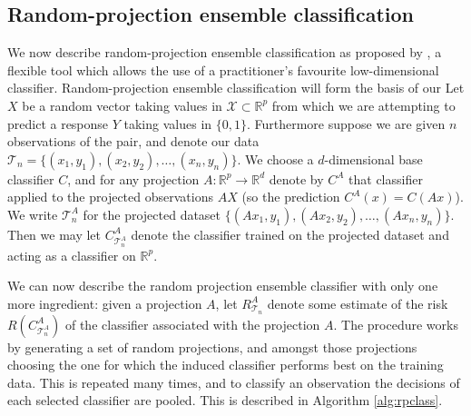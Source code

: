 \documentclass[12pt]{article}
\begin{document}
\subsection{Random-projection ensemble classification}
We now describe random-projection ensemble classification as proposed by \citet{cannings_random-projection_2017}, a flexible tool which allows the use of a practitioner's favourite low-dimensional classifier. Random-projection ensemble classification will form the basis of our Let $X$ be a random vector taking values in $\mathcal{X} \subset \mathbb{R}^p$ from which we are attempting to predict a response $Y$ taking values in $\{0,1\}$. Furthermore suppose we are given $n$ observations of the pair, and denote our data $\mathcal{T}_n = \{(x_1, y_1), (x_2, y_2), \dots, (x_n, y_n)\}$. We choose a $d$-dimensional base classifier $C$, and for any projection $A:\mathbb{R}^p \rightarrow \mathbb{R}^d$ denote by $C^A$ that classifier applied to the projected observations $AX$ (so the prediction $C^A(x) = C(Ax)$). We write $\mathcal{T}_n^A$ for the projected dataset $\{(Ax_1, y_1), (Ax_2, y_2), \dots, (Ax_n, y_n)\}$. Then we may let $C^A_{\mathcal{T}_n^A}$ denote the classifier trained on the projected dataset and acting as a classifier on $\mathbb{R}^p$. 

We can now describe the random projection ensemble classifier with only one more ingredient: given a projection $A$, let $R^A_{\mathcal{T}_n}$ denote some estimate of the risk $R(C^A_{\mathcal{T}_n^A})$ of the classifier associated with the projection $A$. The procedure works by generating a set of random projections, and amongst those projections choosing the one for which the induced classifier performs best on the training data. This is repeated many times, and to classify an observation the decisions of each selected classifier are pooled. This is described in Algorithm \ref{alg:rpclass}.
\end{document}

